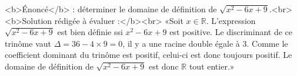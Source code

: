 <b>Énoncé</b> : déterminer le domaine de définition de $\sqrt{x^2-6x+9}$.<br> <b>Solution rédigée à évaluer :</b><br>  «Soit $x\in\mathbb{R}$.  L'expression $\sqrt{x^2-6x+9}$ est bien définie ssi $x^2-6x+9$ est positive. Le discriminant de ce trinôme vaut $\Delta = 36-4\times 9 = 0$, il y a une racine double égale à $3$. Comme le coefficient dominant du trinôme est positif, celui-ci est donc toujours positif. Le domaine de définition de $\sqrt{x^2-6x+9}$ est donc $\mathbb{R}$ tout entier.»

\begin{reponses}
\end{reponses}

\begin{comment}
Réponse correcte mais on ne doit surtout pas utiliser un discriminant pour cela : l'expression $x^2-6x+9$ doit être reconnue, c'est l'identité remarquable pour $a^2-2ab+b^2$.
\end{comment}

